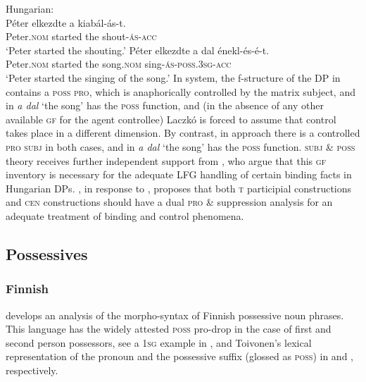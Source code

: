 \documentclass[output=paper,hidelinks]{langscibook}
\begin{document}
\ea%
    \label{ex:FinnoUgric:87}Hungarian:\\
\ea\label{ex:FinnoUgric:87a}
    \gll Péter elkezdte a kiabál-ás-t.\\
        Peter.\textsc{nom} started the shout-\textsc{ás-acc}\\
    \glt `Peter started the shouting.'
    \ex\label{ex:FinnoUgric:87b}
    \gll Péter elkezdte a dal énekl-és-é-t.\\
    Peter.\textsc{nom} started the song.\textsc{nom} sing-\textsc{ás-poss.3sg-acc}\\
    \glt `Peter started the singing of the song.'
\z\z
In  system, the f-structure of the DP in  contains a \textsc{poss} \textsc{pro}, which is anaphorically controlled by the matrix subject, and in  \textit{a dal} `the song' has the \textsc{poss} function, and (in the absence of any other available \textsc{gf} for the agent controllee) Laczkó is forced to assume that control takes place in a different dimension. By contrast, in  approach there is a controlled \textsc{pro} \textsc{subj} in both cases, and in  \textit{a dal} `the song' has the \textsc{poss} function.  \textsc{subj} \& \textsc{poss} theory receives further independent support from \citet{LaczkoRakosi2019}, who argue that this \textsc{gf} inventory is necessary for the adequate LFG handling of certain binding facts in Hungarian DPs. \citet{Laczko2008,Laczko2009a}, in response to \citet{Kenesei2005}, proposes that both \textsc{t} participial constructions and \textsc{cen} constructions should have a dual \textsc{pro} \& suppression analysis for an adequate treatment of binding and control phenomena.

\subsection{Possessives}
\label{sec:FinnoUgric:8.3}

\subsubsection{Finnish}
\label{sec:FinnoUgric:8.3.1}

\citet{Toivonen:FinnPoss} develops an analysis of the morpho-syntax of Finnish possessive noun phrases. This language has the widely attested \textsc{poss} pro-drop in the case of first and second person possessors, see a \textsc{1sg} example in , and Toivonen's lexical representation of the pronoun and the possessive suffix (glossed as \textsc{poss}) in  and , respectively.
\end{document}
